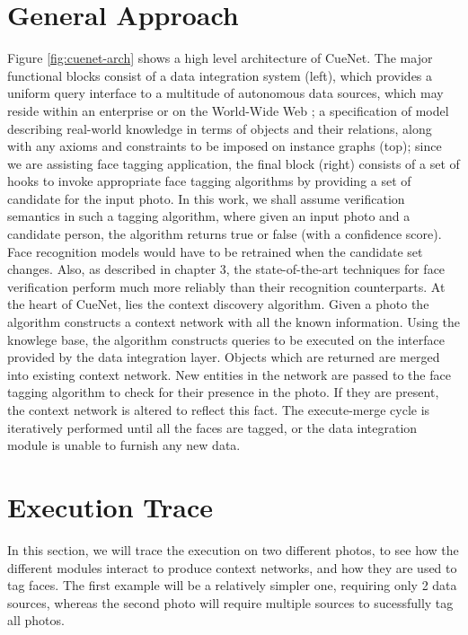 \section{General Approach}
Figure \ref{fig:cuenet-arch} shows a high level architecture of CueNet. The major functional blocks consist of a data integration system (left), which provides a uniform query interface to a multitude of autonomous data sources, which may reside within an enterprise or on the World-Wide Web \cite{halevy2001answering}; a specification of model describing real-world knowledge in terms of objects and their relations, along with any axioms and constraints to be imposed on instance graphs (top); since we are assisting face tagging application, the final block (right) consists of a set of hooks to invoke appropriate face tagging algorithms by providing a set of candidate for the input photo. In this work, we shall assume verification semantics in such a tagging algorithm, where given an input photo and a candidate person, the algorithm returns true or false (with a confidence score). Face recognition models would have to be retrained when the candidate set changes. Also, as described in chapter 3, the state-of-the-art techniques for face verification perform much more reliably than their recognition counterparts. At the heart of CueNet, lies the context discovery algorithm. Given a photo the algorithm constructs a context network with all the known information. Using the knowlege base, the algorithm constructs queries to be executed on the interface provided by the data integration layer. Objects which are returned are merged into existing context network. New entities in the network are passed to the face tagging algorithm to check for their presence in the photo. If they are present, the context network is altered to reflect this fact. The execute-merge cycle is iteratively performed until all the faces are tagged, or the data integration module is unable to furnish any new data.

\section{Execution Trace}
In this section, we will trace the execution on two different photos, to see how the different modules interact to produce context networks, and how they are used to tag faces. The first example will be a relatively simpler one, requiring only 2 data sources, whereas the second photo will require multiple sources to sucessfully tag all photos.

